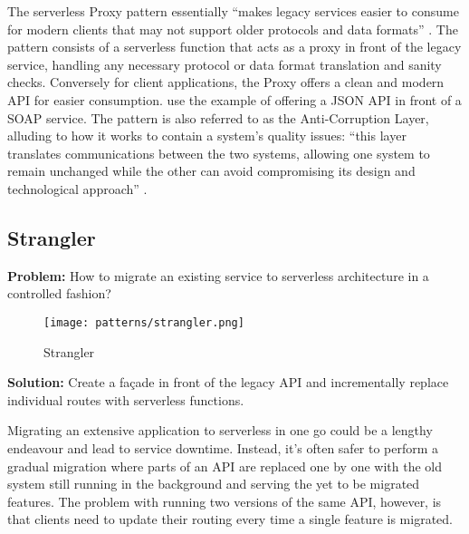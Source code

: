 The serverless Proxy pattern essentially ``makes legacy services easier to consume for modern clients that may not support older protocols and data formats'' \parencite{sbarski2017serverless}. The pattern consists of a serverless function that acts as a proxy in front of the legacy service, handling any necessary protocol or data format translation and sanity checks. Conversely for client applications, the Proxy offers a clean and modern API for easier consumption. \textcite{sbarski2017serverless} use the example of offering a JSON API in front of a SOAP service. The pattern is also referred to as the Anti-Corruption Layer, alluding to how it works to contain a system's quality issues: ``this layer translates communications between the two systems, allowing one system to remain unchanged while the other can avoid compromising its design and technological approach'' \parencite{microsoft18cloudPatterns}.

\subsection{Strangler} \label{subsec:strangler}

\textbf{Problem:} How to migrate an existing service to serverless architecture in a controlled fashion?

\begin{figure}[h]
  \centering
  \texttt{[image: patterns/strangler.png]}
  \caption{Strangler}
  \label{fig:strangler}
\end{figure}

\textbf{Solution:} Create a façade in front of the legacy API and incrementally replace individual routes with serverless functions.

Migrating an extensive application to serverless in one go could be a lengthy endeavour and lead to service downtime. Instead, it's often safer to perform a gradual migration where parts of an API are replaced one by one with the old system still running in the background and serving the yet to be migrated features. The problem with running two versions of the same API, however, is that clients need to update their routing every time a single feature is migrated. \parencite{microsoft18cloudPatterns}

